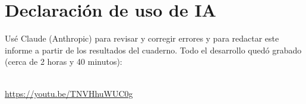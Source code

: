 \documentclass[11pt,letterpaper]{article}
\begin{document}
\section{Declaración de uso de IA}\label{sec:ia}

Usé Claude (Anthropic) para revisar y corregir errores y para redactar este informe a partir de los resultados del cuaderno. Todo el desarrollo quedó grabado (cerca de 2 horas y 40 minutos):

\begin{center}
\\[0.6em]
\url{https://youtu.be/TNVHhuWUC0g}
\end{center}
\end{document}
